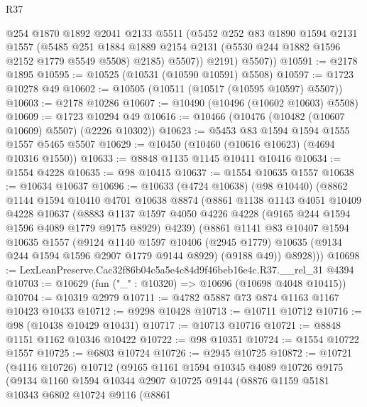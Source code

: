 \begin{lexlean}{R37}
\begin{coremodule}
            @254
            @1870
            @1892
            @2041
            @2133
            @5511
            (@5452
              @252
              @83
              @1890
              @1594
              @2131
              @1557
              (@5485
                @251
                @1884
                @1889
                @2154
                @2131
                (@5530 @244 @1882 @1596 @2152 @1779 @5549 @5508)
                @2185)
              @5507))
          @2191)
        @5507))
@10591 := @2178 @1895
@10595 := @10525 (@10531 (@10590 @10591) @5508)
@10597 := @1723 @10278 @49
@10602 := @10505 (@10511 (@10517 (@10595 @10597) @5507))
@10603 := @2178 @10286
@10607 := @10490 (@10496 (@10602 @10603) @5508)
@10609 := @1723 @10294 @49
@10616 := @10466 (@10476 (@10482 (@10607 @10609) @5507) (@2226 @10302))
@10623 := @5453 @83 @1594 @1594 @1555 @1557 @5465 @5507
@10629 := @10450 (@10460 (@10616 @10623) (@4694 @10316 @1550))
@10633 := @8848 @1135 @1145 @10411 @10416
@10634 := @1554 @4228
@10635 := @98 @10415
@10637 := @1554 @10635 @1557
@10638 := @10634 @10637
@10696 := @10633
    (@4724 @10638)
    (@98 @10440)
    (@8862
      @1144
      @1594
      @10410
      @4701
      @10638
      @8874
      (@8861
        @1138
        @1143
        @4051
        @10409
        @4228
        @10637
        (@8883 @1137 @1597 @4050 @4226 @4228 (@9165 @244 @1594 @1596 @4089 @1779 @9175 @8929) @4239)
        (@8861
          @1141
          @83
          @10407
          @1594
          @10635
          @1557
          (@9124
            @1140
            @1597
            @10406
            (@2945 @1779)
            @10635
            (@9134 @244 @1594 @1596 @2907 @1779 @9144 @8929)
            (@9188 @49))
          @8928)))
@10698 := LexLeanPreserve.Cac32f86b04c5a5e4c84d9f46beb16e4c.R37.__rel_31 @4394
@10703 := @10629 (fun ("_" : @10320) => @10696 (@10698 @4048 @10415))
@10704 := @10319 @2979
@10711 := @4782 @5887 @73 @874 @1163 @1167 @10423 @10433
@10712 := @9298 @10428
@10713 := @10711 @10712
@10716 := @98 (@10438 @10429 @10431)
@10717 := @10713 @10716
@10721 := @8848 @1151 @1162 @10346 @10422
@10722 := @98 @10351
@10724 := @1554 @10722 @1557
@10725 := @6803 @10724
@10726 := @2945 @10725
@10872 := @10721
    (@4116 @10726)
    @10712
    (@9165
      @1161
      @1594
      @10345
      @4089
      @10726
      @9175
      (@9134
        @1160
        @1594
        @10344
        @2907
        @10725
        @9144
        (@8876
          @1159
          @5181
          @10343
          @6802
          @10724
          @9116
          (@8861

\end{coremodule}
\end{lexlean}
